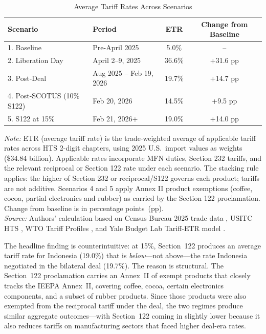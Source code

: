 \documentclass[12pt,a4paper]{article}
\begin{document}
\begin{table}[htbp]
\centering
\caption{Average Tariff Rates Across Scenarios}
\begin{tabular}{llcc}
\toprule
\textbf{Scenario} & \textbf{Period} & \textbf{ETR} & \textbf{Change from Baseline} \\
\midrule
1. Baseline & Pre-April 2025 & 5.0\% & -- \\
2. Liberation Day & April 2--9, 2025 & 36.6\% & +31.6 pp \\
3. Post-Deal & Aug 2025 -- Feb 19, 2026 & 19.7\% & +14.7 pp \\
4. Post-SCOTUS (10\% S122) & Feb 20, 2026 & 14.5\% & +9.5 pp \\
5. S122 at 15\% & Feb 21, 2026+ & 19.0\% & +14.0 pp \\
\bottomrule
\end{tabular}
\par\smallskip
\begin{minipage}{\linewidth}
\footnotesize
\textit{Note:} ETR (average tariff rate) is the trade-weighted average of applicable tariff rates across HTS 2-digit chapters, using 2025 U.S.\ import values as weights (\$34.84 billion). Applicable rates incorporate MFN duties, Section 232 tariffs, and the relevant reciprocal or Section 122 rate under each scenario. The stacking rule applies: the higher of Section 232 or reciprocal/S122 governs each product; tariffs are not additive. Scenarios 4 and 5 apply Annex II product exemptions (coffee, cocoa, partial electronics and rubber) as carried by the Section 122 proclamation. Change from baseline is in percentage points~(pp).\\
\textit{Source:} Authors' calculation based on Census Bureau 2025 trade data \cite{census2024}, USITC HTS \cite{usitc_hts}, WTO Tariff Profiles \cite{wto_tariff}, and Yale Budget Lab Tariff-ETR model \cite{yalebudgetlab_model}.
\end{minipage}
\label{tab:etr}
\end{table}

The headline finding is counterintuitive: at 15\%, Section~122 produces an average tariff rate for Indonesia (19.0\%) that is \textit{below}---not above---the rate Indonesia negotiated in the bilateral deal (19.7\%). The reason is structural. The Section~122 proclamation carries an Annex~II of exempt products that closely tracks the IEEPA Annex~II, covering coffee, cocoa, certain electronics components, and a subset of rubber products. Since those products were also exempted from the reciprocal tariff under the deal, the two regimes produce similar aggregate outcomes---with Section~122 coming in slightly lower because it also reduces tariffs on manufacturing sectors that faced higher deal-era rates.
\end{document}
